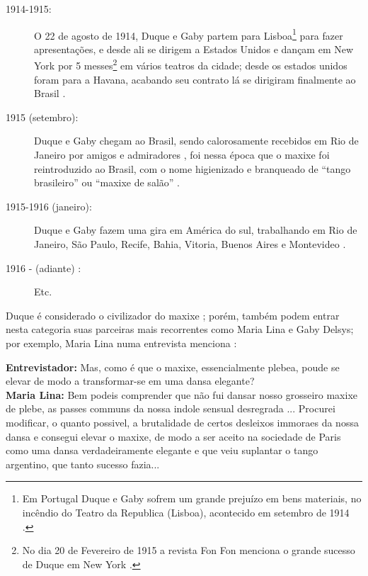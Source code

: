 \begin{description}
\item[1914-1915:] O 22 de agosto de 1914, Duque e Gaby 
partem para Lisboa\footnote{Em Portugal Duque e Gaby sofrem um grande prejuízo em bens materiais, 
no incêndio do Teatro da Republica (Lisboa), acontecido em setembro de 1914 \cite[pp. 4]{maxixe1914duque:1}.}
 para fazer apresentações, 
e desde ali se dirigem a Estados Unidos e dançam em New York
por 5 messes\footnote{No 
dia 20 de Fevereiro de 1915 a revista Fon Fon menciona o grande sucesso de Duque em New York \cite[pp. 45]{maxixe1915duqueEEUU:1}.}
em vários teatros da cidade; 
desde os estados unidos foram para a Havana, acabando seu contrato lá  
se dirigiram finalmente ao Brasil \cite[pp. 6]{maxixe1916duquegaby:1} \cite[pp. 1]{maxixeparis1915:0}.

\item[1915 (setembro):] Duque e Gaby chegam ao Brasil, 
sendo calorosamente recebidos em Rio de Janeiro por amigos e admiradores 
\cite[pp. 1]{maxixeparis1915:0} \cite[pp. 2]{maxixeparis1915}  \cite[pp. 73-75]{shaw2018tropical},
foi nessa época que o maxixe foi reintroduzido ao Brasil, com o nome higienizado e branqueado de 
``tango brasileiro'' ou ``maxixe de salão'' \cite[pp. 74-75]{shaw2018tropical}.

\item[1915-1916 (janeiro):] Duque e Gaby fazem uma gira em América do sul, 
trabalhando em Rio de Janeiro, São Paulo, Recife, Bahia, Vitoria, Buenos Aires e Montevideo
\cite[pp. 6]{maxixe1916duquegaby:1} \cite[pp. 5]{maxixe1916duquegaby:2}. 
\item[1916 - (adiante)  :] Etc.
\end{description}

Duque é considerado o civilizador do maxixe \cite[pp. 129]{efege1974maxixe};
porém, também podem entrar nesta categoria suas parceiras mais recorrentes como Maria Lina e Gaby Delsys;
por exemplo, Maria Lina numa entrevista menciona \cite[pp. 3]{maxixe1913marialina}:
\begin{citando}%
\textbf{Entrevistador:} Mas, como é que o maxixe, essencialmente plebea,
poude se elevar de modo a transformar-se em uma dansa elegante?\\
\textbf{Maria Lina:} Bem podeis comprender que não fui dansar nosso 
grosseiro maxixe de plebe,
as passes communs da nossa indole sensual desregrada ...
Procurei modificar, o quanto possivel,
a brutalidade de certos desleixos immoraes da nossa dansa 
e consegui elevar o maxixe,
de modo a ser aceito na sociedade de Paris como uma dansa 
verdadeiramente elegante e que veiu suplantar o tango argentino, 
que tanto sucesso fazia...
\end{citando}

